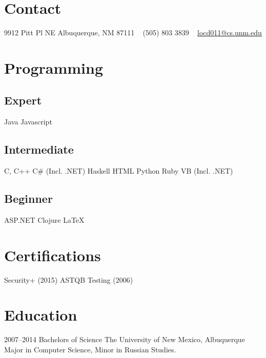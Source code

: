 \documentclass[]{friggeri-cv} %
\begin{document}


\begin{aside} %
\section{Contact}
9912 Pitt Pl NE
Albuquerque, NM 87111
~
(505) 803 3839
~
\href{mailto:locd011@cs.unm.edu}{locd011@cs.unm.edu}
\section{Programming}
\subsection{Expert}
Java
Javascript
\subsection{Intermediate}
C, C++
C\# (Incl. .NET)
Haskell
HTML
Python
Ruby
VB (Incl. .NET)
\subsection{Beginner}
ASP.NET
Clojure
LaTeX
\section{Certifications}
Security+ (2015)
ASTQB Testing (2006)
\end{aside}


\section{Education}

\begin{entrylist}
\entry
{2007--2014}
{Bachelors {\normalfont of Science}}
{The University of New Mexico, Albuquerque}
{Major in Computer Science, Minor in Russian Studies.}
\end{entrylist}
\end{document}
